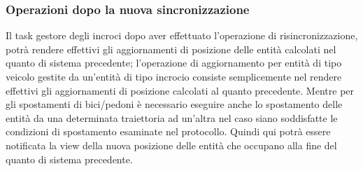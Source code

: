 \subsubsection*{Operazioni dopo la nuova sincronizzazione} 
Il task gestore degli incroci dopo aver effettuato l'operazione di risincronizzazione, potrà rendere effettivi gli aggiornamenti di posizione delle entità calcolati nel quanto di sistema precedente; l'operazione di aggiornamento per entità di tipo veicolo gestite da un'entità di tipo incrocio consiste semplicemente nel rendere effettivi gli aggiornamenti di posizione calcolati al quanto precedente. Mentre per gli spostamenti di bici/pedoni è necessario eseguire anche lo spostamento delle entità da una determinata traiettoria ad un'altra nel caso siano soddisfatte le condizioni di spostamento esaminate nel protocollo. Quindi qui potrà essere notificata la view della nuova posizione delle entità che occupano alla fine del quanto di sistema precedente.  